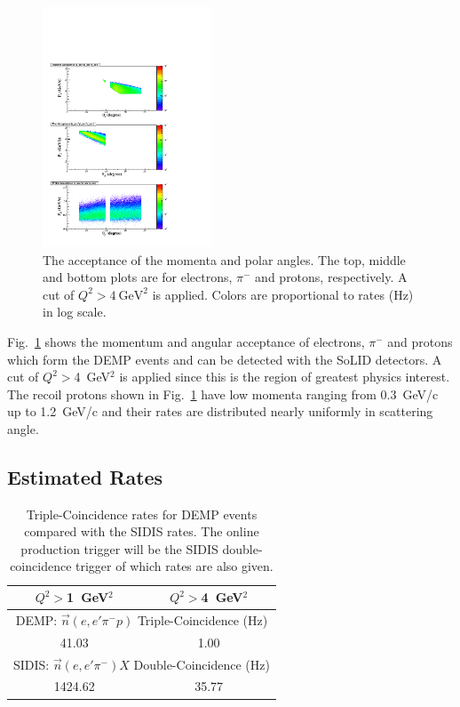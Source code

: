 \begin{figure}[!ht]
 \begin{center}
   \includegraphics[type=pdf,
     ext=.pdf,read=.pdf,width=0.45\textwidth]{./figures/E11_acc_epip_Q2gt4}
   \caption[The acceptance of the momenta and scattering angles for electrons,
    $\pi^{-}$ and protons]{\footnotesize{The acceptance of the momenta and
    polar angles. The top, middle and
    bottom plots are for electrons, $\pi^{-}$ and protons, respectively. A
    cut of $Q^{2}>4~\mathrm{GeV^{2}}$ is applied. Colors are proportional to rates
    (Hz) in log scale.}}
  \label{p_theta}
  \end{center}
\end{figure}

Fig.~\ref{p_theta} shows the momentum and angular acceptance of electrons,
$\pi^{-}$ and protons which form the DEMP events and can be detected with the
SoLID detectors.  A cut of $Q^2>$4~GeV$^2$ is applied since this is the region of greatest physics interest.  The recoil
protons shown in Fig.~\ref{p_theta} have low momenta ranging from 0.3~GeV/c up
to 1.2~GeV/c and their rates are distributed nearly uniformly in scattering
angle.

\subsection{Estimated Rates}

\begin{table}[!ht]
\centering
\begin{tabular}{|c|c|}
 \hline
  $Q^2>$1~GeV$^2$ & $Q^2>$4~GeV$^2$\\
 \hline
\multicolumn{2}{|c|}{DEMP: $\vec{n}(e,e'\pi^{-}p)$ Triple-Coincidence (Hz)}\\
 \hline
 41.03   &  1.00  \\
 \hline
\multicolumn{2}{|c|}{SIDIS: $\vec{n}(e,e'\pi^{-})X$ Double-Coincidence (Hz)}\\
 \hline
   1424.62  & 35.77   \\
 \hline
\end{tabular}
\caption[Triple-Coincidence rates for
  neutron-DEMP]{\footnotesize{Triple-Coincidence rates for DEMP events compared
    with the SIDIS rates.  The online production
    trigger will be the SIDIS double-coincidence trigger of which rates are
    also given.}}
\label{rate_table}
\end{table} 

